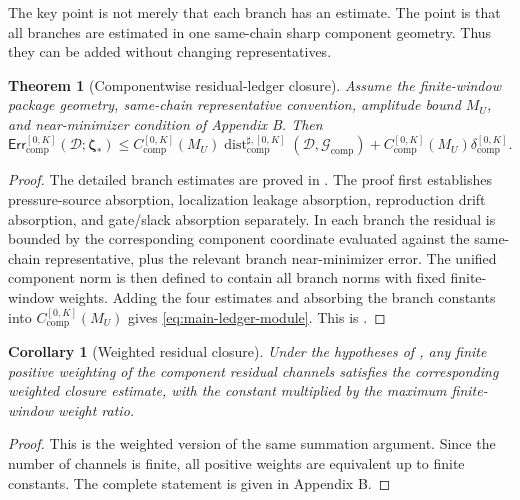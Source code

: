 \documentclass[11pt]{article}
\numberwithin{equation}{section}
\newtheorem{theorem}{Theorem}[section]
\newtheorem{corollary}[corollary]{Corollary}
\theoremstyle{definition}
\theoremstyle{remark}
\newcommand{\comp}{\mathrm{comp}}
\newcommand{\Err}{\mathsf{Err}}
\newcommand{\Dist}{\operatorname{dist}}
\newcommand{\calD}{\mathcal D}
\newcommand{\calG}{\mathcal G}
\newcommand{\bzeta}{\boldsymbol\zeta}
\begin{document}
The key point is not merely that each branch has an estimate.  The point is that all branches are estimated in one same-chain sharp component geometry.  Thus they can be added without changing representatives.

\begin{theorem}[Componentwise residual-ledger closure]\label{thm:main-ledger-module}
Assume the finite-window package geometry, same-chain representative convention, amplitude bound \(M_U\), and near-minimizer condition of Appendix B.  Then
\begin{equation}\label{eq:main-ledger-module}
        \Err_{\comp}^{[0,K]}(\calD;\bzeta_*)
        \le
        C_{\comp}^{[0,K]}(M_U)
        \Dist_{\comp}^{\sharp,[0,K]}(\calD,\calG_{\comp})
        +
        C_{\comp}^{[0,K]}(M_U)
        \delta_{\comp}^{[0,K]}.
\end{equation}
\end{theorem}

\begin{proof}
The detailed branch estimates are proved in .  The proof first establishes pressure-source absorption, localization leakage absorption, reproduction drift absorption, and gate/slack absorption separately.  In each branch the residual is bounded by the corresponding component coordinate evaluated against the same-chain representative, plus the relevant branch near-minimizer error.  The unified component norm is then defined to contain all branch norms with fixed finite-window weights.  Adding the four estimates and absorbing the branch constants into \(C_{\comp}^{[0,K]}(M_U)\) gives \eqref{eq:main-ledger-module}.  This is .
\end{proof}

\begin{corollary}[Weighted residual closure]\label{cor:main-weighted-ledger}
Under the hypotheses of , any finite positive weighting of the component residual channels satisfies the corresponding weighted closure estimate, with the constant multiplied by the maximum finite-window weight ratio.
\end{corollary}

\begin{proof}
This is the weighted version of the same summation argument.  Since the number of channels is finite, all positive weights are equivalent up to finite constants.  The complete statement is given in Appendix B.
\end{proof}
\end{document}
